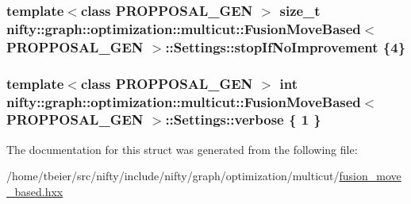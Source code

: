 \subsubsection[{stop\+If\+No\+Improvement}]{\setlength{\rightskip}{0pt plus 5cm}template$<$class P\+R\+O\+P\+P\+O\+S\+A\+L\+\_\+\+G\+E\+N $>$ size\+\_\+t {\bf nifty\+::graph\+::optimization\+::multicut\+::\+Fusion\+Move\+Based}$<$ P\+R\+O\+P\+P\+O\+S\+A\+L\+\_\+\+G\+E\+N $>$\+::Settings\+::stop\+If\+No\+Improvement \{4\}}\label{structnifty_1_1graph_1_1optimization_1_1multicut_1_1FusionMoveBased_1_1Settings_adf6ad1d8f27a2561b74d6d70668b2d42}
\hypertarget{structnifty_1_1graph_1_1optimization_1_1multicut_1_1FusionMoveBased_1_1Settings_a2c319dc2449b03a86dff54cfe44c2043}{}
\subsubsection[{verbose}]{\setlength{\rightskip}{0pt plus 5cm}template$<$class P\+R\+O\+P\+P\+O\+S\+A\+L\+\_\+\+G\+E\+N $>$ int {\bf nifty\+::graph\+::optimization\+::multicut\+::\+Fusion\+Move\+Based}$<$ P\+R\+O\+P\+P\+O\+S\+A\+L\+\_\+\+G\+E\+N $>$\+::Settings\+::verbose \{ 1 \}}\label{structnifty_1_1graph_1_1optimization_1_1multicut_1_1FusionMoveBased_1_1Settings_a2c319dc2449b03a86dff54cfe44c2043}


The documentation for this struct was generated from the following file\+:\begin{DoxyCompactItemize}
\item 
/home/tbeier/src/nifty/include/nifty/graph/optimization/multicut/\hyperlink{multicut_2fusion__move__based_8hxx}{fusion\+\_\+move\+\_\+based.\+hxx}\end{DoxyCompactItemize}
